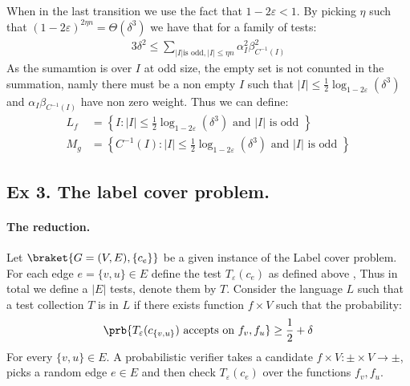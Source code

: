 \documentclass{article}
\begin{document}
 When in the last transition we use the fact that $1-2\varepsilon < 1$. By picking $\eta$ such that $(1-2\varepsilon)^{2\eta n } = \Theta\left( \delta^{3} \right)$ we have that for a family of tests:   
 \begin{equation}
   \label{equ:we}
   \begin{split}
     3\delta^{2} \le  \sum_{|I| \text{is odd} , |I| \le \eta n  }{\alpha_{I}^{2}\beta_{C^{-1}(I)}^{2}}
   \end{split}
 \end{equation}
 As the sumamtion is over $I$ at odd size, the empty set is not conunted in the summation, namly there must be a non empty $I$ such that $|I| \le \frac{1}{2} \log_{1-2\varepsilon}\left( \delta^{3} \right)$ and $\alpha_{I}\beta_{C^{-1}\left( I \right)}$ have non zero weight. Thus we can define: 
 \begin{equation*}
   \begin{split}
 L_{f} & = \left\{ I : |I| \le \frac{1}{2} \log_{1-2\varepsilon}\left( \delta^{3} \right) \text{ and } |I| \text{ is odd } \right\} \\
 M_{g} & = \left\{ C^{-1}(I) : |I| \le \frac{1}{2} \log_{1-2\varepsilon}\left( \delta^{3} \right) \text{ and } |I| \text{ is odd } \right\}
   \end{split}
 \end{equation*}
%
\subsection{Ex 3. The label cover problem.} 
\paragraph{The reduction.} Let $\braket{G=(V,E), \{ c_{e} \} }$ be a given instance of the Label cover problem. For each edge $e = \{v,u\} \in E$ define the test $T_{\varepsilon}\left( c_{e} \right)$ as defined above , Thus in total we define a $|E|$ tests, denote them by $T$. Consider the language $L$ such that a test collection $T$ is in $L$ if there exists function $f \times V$ such that the probability:  
\begin{equation*}
  \begin{split}
    \prb{T_{\varepsilon}(c_{ \{ v,u\} }) \text{ accepts on } f_{v},f_{u} } \ge \frac{1}{2} + \delta
  \end{split}
\end{equation*}
For every $\{v, u\} \in E$. A probabilistic verifier takes a candidate $f\times V : \pm  \times V \rightarrow \pm$, picks a random edge $e \in E$ and then check $T_{\varepsilon}\left( c_{e} \right)$ over the functions $f_{v},f_{u}$.    
\end{document}
